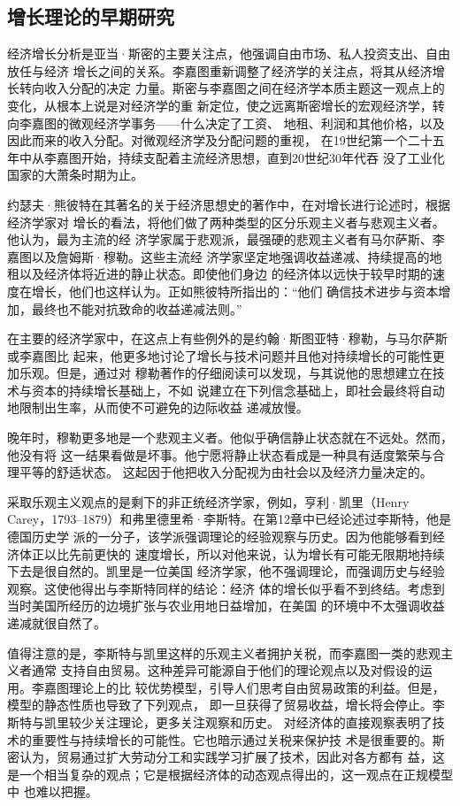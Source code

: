 \subsection{增长理论的早期研究}

经济增长分析是亚当·斯密的主要关注点，他强调自由市场、私人投资支出、自由放任与经济
增长之间的关系。李嘉图重新调整了经济学的关注点，将其从经济增长转向收入分配的决定
力量。斯密与李嘉图之间在经济学本质主题这一观点上的变化，从根本上说是对经济学的重
新定位，使之远离斯密增长的宏观经济学，转向李嘉图的微观经济学事务——什么决定了工资、
地租、利润和其他价格，以及因此而来的收入分配。对微观经济学及分配问题的重视，
在19世纪第一个二十五年中从李嘉图开始，持续支配着主流经济思想，直到20世纪30年代吞
没了工业化国家的大萧条时期为止。

约瑟夫·熊彼特在其著名的关于经济思想史的著作中，在对增长进行论述时，根据经济学家对
增长的看法，将他们做了两种类型的区分乐观主义者与悲观主义者。他认为，最为主流的经
济学家属于悲观派，最强硬的悲观主义者有马尔萨斯、李嘉图以及詹姆斯·穆勒。这些主流经
济学家坚定地强调收益递减、持续提高的地租以及经济体将近进的静止状态。即使他们身边
的经济体以远快于较早时期的速度在增长，他们也这样认为。正如熊彼特所指出的：“他们
确信技术进步与资本增加，最终也不能对抗致命的收益递减法则。”

在主要的经济学家中，在这点上有些例外的是约翰·斯图亚特·穆勒，与马尔萨斯或李嘉图比
起来，他更多地讨论了增长与技术问题并且他对持续增长的可能性更加乐观。但是，通过对
穆勒著作的仔细阅读可以发现，与其说他的思想建立在技术与资本的持续增长基础上，不如
说建立在下列信念基础上，即社会最终将自动地限制出生率，从而使不可避免的边际收益
递减放慢。

晚年时，穆勒更多地是一个悲观主义者。他似乎确信静止状态就在不远处。然而，他没有将
这一结果看做是坏事。他宁愿将静止状态看成是一种具有适度繁荣与合理平等的舒适状态。
这起因于他把收入分配视为由社会以及经济力量决定的。

采取乐观主义观点的是剩下的非正统经济学家，例如，亨利·凯里（Henry
Carey，1793--1879）和弗里德里希·李斯特。在第12章中已经论述过李斯特，他是德国历史学
派的一分子，该学派强调理论的经验观察与历史。因为他能够看到经济体正以比先前更快的
速度增长，所以对他来说，认为增长有可能无限期地持续下去是很自然的。凯里是一位美国
经济学家，他不强调理论，而强调历史与经验观察。这使他得出与李斯特同样的结论：经济
体的增长似乎看不到终结。考虑到当时美国所经历的边境扩张与农业用地日益增加，在美国
的环境中不太强调收益递减就很自然了。

值得注意的是，李斯特与凯里这样的乐观主义者拥护关税，而李嘉图一类的悲观主义者通常
支持自由贸易。这种差异可能源自于他们的理论观点以及对假设的运用。李嘉图理论上的比
较优势模型，引导人们思考自由贸易政策的利益。但是，模型的静态性质也导致了下列观点，
即一旦获得了贸易收益，增长将会停止。李斯特与凯里较少关注理论，更多关注观察和历史。
对经济体的直接观察表明了技术的重要性与持续增长的可能性。它也暗示通过关税来保护技
术是很重要的。斯密认为，贸易通过扩大劳动分工和实践学习扩展了技术，因此对各方都有
益，这是一个相当复杂的观点；它是根据经济体的动态观点得出的，这一观点在正规模型中
也难以把握。

